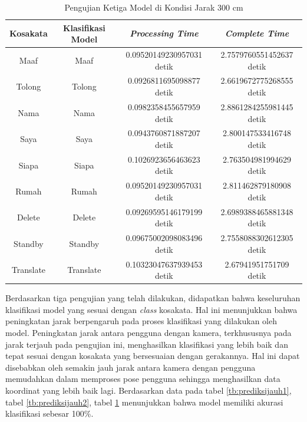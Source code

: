 \newpage
\begin{longtable}{|c|c|c|c|}
  \caption{Pengujian Ketiga Model di Kondisi Jarak 300 cm}
  \label{tb:prediksijauh3}                                   \\
  \hline
  \rowcolor[HTML]{C0C0C0}
  \textbf{Kosakata} & \textbf{Klasifikasi Model} & \textbf{\emph{Processing Time}} & \textbf{\emph{Complete Time}}\\
  \hline
  Maaf              & Maaf                        & 0.09520149230957031 detik                          & 2.7579760551452637 detik                                 \\
  Tolong            & Tolong                      & 0.0926811695098877 detik                          & 2.6619672775268555 detik                                 \\
  Nama              & Nama                        & 0.0982358455657959 detik                          & 2.8861284255981445 detik                                 \\
  Saya              & Saya                        & 0.0943760871887207 detik                          & 2.800147533416748 detik                                 \\
  Siapa             & Siapa                       & 0.1026923656463623 detik                          & 2.763504981994629 detik                                 \\
  Rumah             & Rumah                       & 0.09520149230957031 detik                          & 2.811462879180908 detik                                  \\
  Delete            & Delete                      & 0.09269595146179199 detik                          & 2.6989388465881348 detik                                 \\
  Standby           & Standby                     & 0.09675002098083496 detik                          & 2.7558088302612305 detik                                  \\
  Translate         & Translate                   & 0.10323047637939453 detik                          & 2.67941951751709 detik                                  \\
  \hline
\end{longtable}

Berdasarkan tiga pengujian yang telah dilakukan, didapatkan bahwa keseluruhan klasifikasi model yang sesuai dengan \emph{class} kosakata. Hal ini menunjukkan bahwa peningkatan jarak berpengaruh pada proses klasifikasi yang dilakukan oleh model. Peningkatan jarak antara pengguna dengan kamera, terkhususnya pada jarak terjauh pada pengujian ini, menghasilkan klasifikasi yang lebih baik dan tepat sesuai dengan kosakata yang bersesuaian dengan gerakannya. Hal ini dapat disebabkan oleh semakin jauh jarak antara kamera dengan pengguna memudahkan dalam memproses pose pengguna sehingga menghasilkan data koordinat yang lebih baik lagi. Berdasarkan data pada tabel \ref{tb:prediksijauh1}, tabel \ref{tb:prediksijauh2}, tabel \ref{tb:prediksijauh3} menunjukkan bahwa model memiliki akurasi klasifikasi sebesar 100\%.

